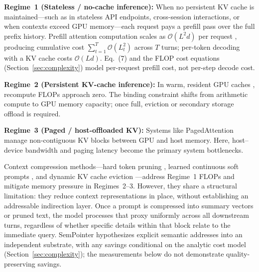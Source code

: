 \documentclass[runningheads]{llncs}
\begin{document}
\textbf{Regime~1 (Stateless / no-cache inference):} When no persistent KV cache is maintained---such as in stateless API endpoints, cross-session interactions, or when contexts exceed GPU memory---each request pays a prefill pass over the full prefix history. Prefill attention computation scales as $\mathcal{O}(L^2 d)$ per request \cite{vaswani2017attention}, producing cumulative cost $\sum_{t=1}^T \mathcal{O}(L_t^2)$ across $T$ turns; per-token decoding with a KV cache costs $\mathcal{O}(Ld)$. Eq.~(7) and the FLOP cost equations (Section~\ref{sec:complexity}) model per-request prefill cost, not per-step decode cost.

\textbf{Regime~2 (Persistent KV-cache inference):} In warm, resident GPU caches \cite{kwon2023pagedattention}, recompute FLOPs approach zero. The binding constraint shifts from arithmetic compute to GPU memory capacity; once full, eviction or secondary storage offload is required.

\textbf{Regime~3 (Paged / host-offloaded KV):} Systems like PagedAttention \cite{kwon2023pagedattention} manage non-contiguous KV blocks between GPU and host memory. Here, host--device bandwidth and paging latency become the primary system bottlenecks.

Context compression methods---hard token pruning \cite{jiang2023llmlingua, jiang2024longllmlingua, pan2024llmlingua2}, learned continuous soft prompts \cite{mu2023gist, chevalier2023autocompressors, ge2024icae, li2025500xcompressor}, and dynamic KV cache eviction \cite{kim2024ccm, liu2025sac}---address Regime~1 FLOPs and mitigate memory pressure in Regimes~2--3. However, they share a structural limitation: they reduce context representations in place, without establishing an addressable indirection layer. Once a prompt is compressed into summary vectors or pruned text, the model processes that proxy uniformly across all downstream turns, regardless of whether specific details within that block relate to the immediate query. SemPointer hypothesizes explicit semantic addresses into an independent substrate, with any savings conditional on the analytic cost model (Section~\ref{sec:complexity}); the measurements below do not demonstrate quality-preserving savings.
\end{document}
